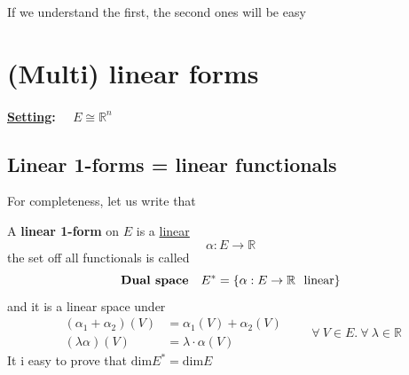 \documentclass[../main.tex]{subfiles}
\begin{document}
If we understand the first, the second ones will be easy 
\section{(Multi) linear forms}
\paragraph{\underline{Setting}: $\quad E\cong \mathbb{R}^n$}
\subsection{Linear 1-forms = linear functionals}
For completeness, let us write that
\begin{definition}
A \textbf{linear 1-form} on $E$ is a \underline{linear} 
\[
\alpha: E \to \mathbb{R}
\]
the set off all functionals is called 
\[
\textrm{\textbf{Dual space}} \quad E^\ast=\left\{\alpha: E\to\mathbb{R} \ \textrm{ linear} \right\}
\]
and it is a linear space under
\[
\begin{split}
    \left(\alpha_1+\alpha_2\right)(V) &=\alpha_1(V)+\alpha_2(V)\\
    \left(\lambda\alpha\right)(V) &= \lambda\cdot\alpha(V)
\end{split}
\qquad \forall \ V\in E. \ \forall \ \lambda\in\mathbb{R}
\]
It i easy to prove that \(\textrm{dim}E^\ast=\textrm{dim}E\)
\end{definition}
\end{document}

